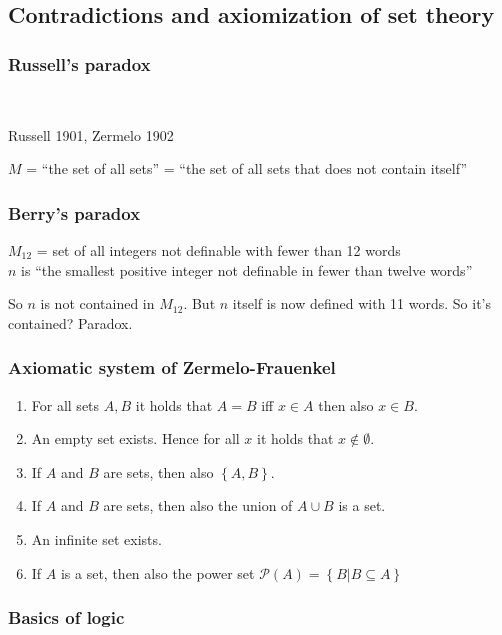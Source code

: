 \documentclass[a4paper,landscape,twocolumn]{article}
\newcommand\set[1]{\left\{#1\right\}}
\begin{document}
\subsection{Contradictions and axiomization of set theory}
\subsubsection{Russell's paradox}

 \\

Russell 1901, Zermelo 1902

$M$ = \enquote{the set of all sets} = \enquote{the set of all sets that does not contain itself}

\subsubsection{Berry's paradox}

$M_{12}$ = set of all integers not definable with fewer than 12 words \\
$n$ is \enquote{the smallest positive integer not definable in fewer than twelve words}

So $n$ is not contained in $M_{12}$. But $n$ itself is now defined with 11 words.
So it's contained? Paradox.

\subsubsection{Axiomatic system of Zermelo-Frauenkel}

\begin{enumerate}
  \item For all sets $A, B$ it holds that $A = B$ iff $x \in A$ then also $x \in B$.
  \item An empty set exists. Hence for all $x$ it holds that $x \notin \emptyset$.
  \item If $A$ and $B$ are sets, then also $\set{A, B}$.
  \item If $A$ and $B$ are sets, then also the union of  $A \cup B$ is a set.
  \item An infinite set exists.
  \item If $A$ is a set, then also the power set $\mathcal{P}(A) = \set{B | B \subseteq A}$
\end{enumerate}

\subsubsection{Basics of logic}
\end{document}
